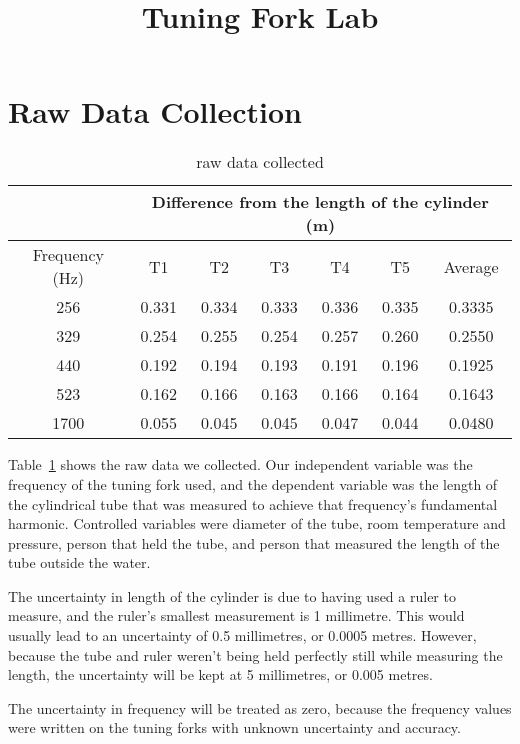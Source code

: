 \documentclass{article}
\title{Tuning Fork Lab}
\begin{document}
\maketitle

\section{Raw Data Collection}

\begin{table}[H]
  \centering
  \begin{tabular}{@{}ccccccc@{}}
    \toprule
    & \multicolumn{6}{c}{Difference from the length of the cylinder
    (m)} \\
    \midrule
    Frequency (Hz) & T1    & T2    & T3    & T4    & T5    & Average \\
    256            & 0.331 & 0.334 & 0.333 & 0.336 & 0.335 & 0.3335  \\
    329            & 0.254 & 0.255 & 0.254 & 0.257 & 0.260 & 0.2550  \\
    440            & 0.192 & 0.194 & 0.193 & 0.191 & 0.196 & 0.1925  \\
    523            & 0.162 & 0.166 & 0.163 & 0.166 & 0.164 & 0.1643  \\
    1700           & 0.055 & 0.045 & 0.045 & 0.047 & 0.044 & 0.0480  \\
    \bottomrule
  \end{tabular}
  \caption{raw data collected}\label{tab:raw-data}
\end{table}

Table~\ref{tab:raw-data} shows the raw data we collected. Our
independent variable was
the frequency of the tuning fork used, and the dependent variable was
the length of the cylindrical tube that was measured to achieve that
frequency's fundamental harmonic. Controlled variables were diameter
of the tube, room temperature and pressure, person that held the
tube, and person that measured the length of the tube outside the water.

The uncertainty in length of the cylinder is due to having used a
ruler to measure, and the ruler's smallest measurement is 1
millimetre. This would usually lead to an uncertainty of 0.5
millimetres, or 0.0005 metres. However, because the tube and ruler
weren't being held perfectly still while measuring the length, the
uncertainty will be kept at 5 millimetres, or 0.005 metres.

The uncertainty in frequency will be treated as zero, because the
frequency values were written on the tuning forks with unknown
uncertainty and accuracy.
\end{document}
